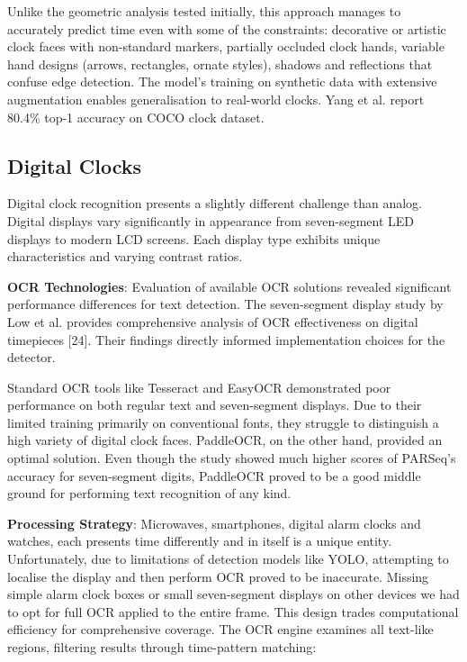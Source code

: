 Unlike the geometric analysis tested initially, this approach manages to accurately predict time even with some of the constraints: decorative or artistic clock faces with non-standard markers, partially occluded clock hands, variable hand designs (arrows, rectangles, ornate styles), shadows and reflections that confuse edge detection. The model's training on synthetic data with extensive augmentation enables generalisation to real-world clocks. Yang et al. report 80.4\% top-1 accuracy on COCO clock dataset.

\subsection{Digital Clocks}
Digital clock recognition presents a slightly different challenge than analog. Digital displays vary significantly in appearance from seven-segment LED displays to modern LCD screens. Each display type exhibits unique characteristics and varying contrast ratios.

\textbf{OCR Technologies}: Evaluation of available OCR solutions revealed significant performance differences for text detection. The seven-segment display study by Low et al. provides comprehensive analysis of OCR effectiveness on digital timepieces [24]. Their findings directly informed implementation choices for the detector.

Standard OCR tools like Tesseract and EasyOCR demonstrated poor performance on both regular text and seven-segment displays. Due to their limited training primarily on conventional fonts, they struggle to distinguish a high variety of digital clock faces. PaddleOCR, on the other hand, provided an optimal solution. Even though the study showed much higher scores of PARSeq's accuracy for seven-segment digits, PaddleOCR proved to be a good middle ground for performing text recognition of any kind.

\textbf{Processing Strategy}: Microwaves, smartphones, digital alarm clocks and watches, each presents time differently and in itself is a unique entity. Unfortunately, due to limitations of detection models like YOLO, attempting to localise the display and then perform OCR proved to be inaccurate. Missing simple alarm clock boxes or small seven-segment displays on other devices we had to opt for full OCR applied to the entire frame. This design trades computational efficiency for comprehensive coverage. The OCR engine examines all text-like regions, filtering results through time-pattern matching:

